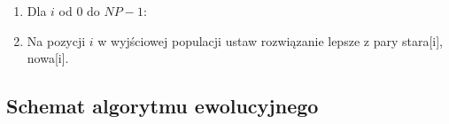 \documentclass[12pt, a4paper]{article}
\begin{document}
\begin{enumerate}
 \item Dla $i$ od 0 do $NP-1$:
 \item Na pozycji $i$ w wyjściowej populacji ustaw rozwiązanie lepsze z pary stara[i], nowa[i].
\end{enumerate}

\subsection{Schemat algorytmu ewolucyjnego}


\nocite{*}


\end{document}
